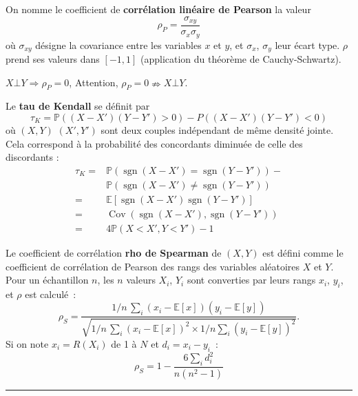 \begin{f}

On nomme le coefficient de \textbf{corrélation linéaire de Pearson} la valeur
\[
\rho_P = \frac{\sigma_{xy}}{\sigma_x \sigma_y}
\]
où \(\sigma_{xy}\) désigne la covariance entre les variables \(x\) et \(y\), et \(\sigma_x\), \(\sigma_y\) leur écart type.
\(\rho\) prend ses valeurs dans \([-1,1]\) (application du théorème de Cauchy-Schwartz).

\(X\bot Y \Rightarrow \rho_P=0\), Attention, \(\rho_P=0 \nRightarrow X\bot Y \). 


 

Le \textbf{tau de Kendall} se définit par
\[
\tau_K=\mathbb{P}((X-X')(Y-Y')>0)-P((X-X')(Y-Y')<0)
\]
où \((X,Y)\)  \((X',Y')\)  sont deux couples indépendant de même densité jointe. Cela correspond à  la probabilité des concordants diminuée de celle des discordants :
\begin{align*}
\tau_K	=&\mathbb{P}\left(\operatorname{sgn}(X-X')=\operatorname{sgn}(Y-Y')\right)-\\
		&\mathbb{P}\left(\operatorname{sgn}(X-X')\neq \operatorname{sgn}(Y-Y')\right)\\
=&\mathbb{E}\left[ \operatorname{sgn}(X-X')\operatorname{sgn}(Y-Y')\right]\\
=&\operatorname{Cov}(\operatorname{sgn}(X-X'),\operatorname{sgn}(Y-Y'))\\
=&4\mathbb{P}(X<X',Y<Y')-1 
\end{align*}

Le coefficient de corrélation \textbf{rho de Spearman} de \((X,Y)\) est défini comme le coefficient de corrélation de Pearson des rangs des variables aléatoires \(X\) et \(Y\).
Pour un échantillon \(n\), les \(n\) valeurs \(X_i\), \(Y_i\) sont converties par leurs rangs \(x_i\), \(y_i\), et \(\rho\) est calculé~:
\[
\rho_S = \frac{1/n\,\sum_i(x_i-\mathbb{E}[x])(y_i-\mathbb{E}[y])}{\sqrt{1/n\,\sum_i (x_i-\mathbb{E}[x])^2 \times 1/n\sum_i(y_i-\mathbb{E}[y])^2}}.
\]
Si on note \(x_i= R(X_i)\) de 1 à \(N\) et  \(d_i = x_i - y_i\)~:
\[    \rho_S = 1- {\frac {6 \sum_i d_i^2}{n(n^2 - 1)}}\]

\end{f}
\hrule

